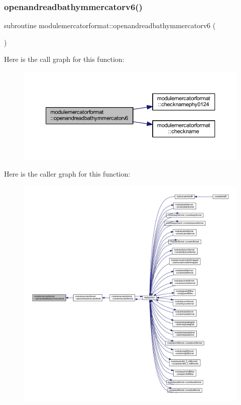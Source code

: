 \subsubsection{\texorpdfstring{openandreadbathymmercatorv6()}{openandreadbathymmercatorv6()}}
{\footnotesize\ttfamily subroutine modulemercatorformat\+::openandreadbathymmercatorv6 (\begin{DoxyParamCaption}{ }\end{DoxyParamCaption})\hspace{0.3cm}{\ttfamily [private]}}

Here is the call graph for this function\+:\nopagebreak
\begin{figure}[H]
\begin{center}
\leavevmode
\includegraphics[width=350pt]{namespacemodulemercatorformat_a19c4e862a6301eb0e3e8c373ab8a15f9_cgraph}
\end{center}
\end{figure}
Here is the caller graph for this function\+:\nopagebreak
\begin{figure}[H]
\begin{center}
\leavevmode
\includegraphics[width=350pt]{namespacemodulemercatorformat_a19c4e862a6301eb0e3e8c373ab8a15f9_icgraph}
\end{center}
\end{figure}
\mbox{\label{namespacemodulemercatorformat_a2c5e1b6294e73cf15d0617776b56408c}} 
